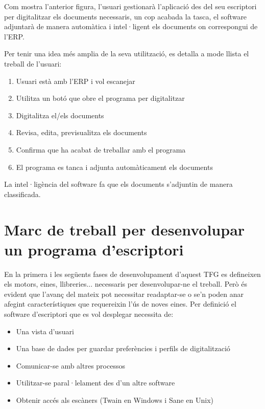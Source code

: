 \documentclass[letterpaper,11pt,catalan]{sphinxmanual}
\begin{document}
Com mostra l'anterior figura, l'usuari gestionarà l'aplicació des del seu escriptori per digitalitzar
els documents necessaris, un cop acabada la tasca, el software adjuntarà de manera
automàtica i intel·ligent els documents on correspongui de l'ERP.

Per tenir una idea més amplia de la seva utilització, es detalla a mode llista
el treball de l'usuari:
\begin{enumerate}
\item {} 
Usuari està amb l'ERP i vol escanejar

\item {} 
Utilitza un botó que obre el programa per digitalitzar

\item {} 
Digitalitza el/els documents

\item {} 
Revisa, edita, previsualitza els documents

\item {} 
Confirma que ha acabat de treballar amb el programa

\item {} 
El programa es tanca i adjunta automàticament els documents

\end{enumerate}

La intel·ligència del software fa que els documents s'adjuntin de manera classificada.


\section{Marc de treball per desenvolupar un programa d'escriptori}
\label{\detokenize{index:marc-de-treball-per-desenvolupar-un-programa-d-escriptori}}
En la primera i les següents fases de desenvolupament d'aquest TFG es defineixen els motors, eines, llibreries...
necessaris per desenvolupar-ne el treball. Però és evident que l'avanç del mateix pot necessitar
readaptar-se o se'n poden anar afegint característiques que requereixin l'ús de noves eines. Per definició el software
d'escriptori que es vol desplegar necessita de:
\begin{itemize}
\item {} 
Una vista d'usuari

\item {} 
Una base de dades per guardar preferències i perfils de digitalització

\item {} 
Comunicar-se amb altres processos

\item {} 
Utilitzar-se paral·lelament des d'un altre software

\item {} 
Obtenir accés als escàners (Twain en Windows i Sane en Unix)

\end{itemize}
\end{document}
